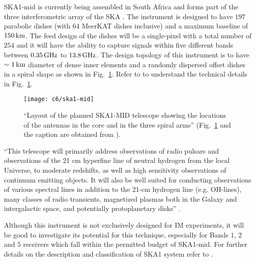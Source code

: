 SKA1-mid is currently being assembled in South Africa and forms part of the three interferometric array of the SKA \citep{2018AAS...23121503S,8105424,vermij2014exascale}. The instrument is designed to have $197$ parabolic dishes (with $64$ MeerKAT dishes inclusive) and a maximum baseline of $150 \, \rm km$. The feed design of the dishes will be a single-pixel with a total number of $254$ \citep{vermij2014exascale} and it will have the ability to capture signals within five different bands between $0.35 \, \rm GHz$ to $13.8 \, \rm GHz$. The design topology of this instrument is to have $\sim 1\, \rm km$ diameter of dense inner elements and a randomly dispersed offset dishes in a spiral shape as shown in Fig.~\ref{fig:ska1-mid}. Refer to \citep{2018arXiv180511455S} to understand the technical details in Fig.~\ref{fig:ska1-mid}.
\begin{figure}
\begin{minipage}[H]{\linewidth}
\centering
\texttt{[image: c6/ska1-mid]}
\caption{\label{fig:ska1-mid} 
\enquote{Layout of the planned SKA1-MID telescope showing the locations of the antennas in the core and in the three spiral arms} (Fig.~\ref{fig:ska1-mid} and the caption are obtained from \citep{2018arXiv180511455S}).}
   \end{minipage}
\end{figure}
\FloatBarrier


\noindent \enquote{This telescope will primarily address observations of radio pulsars and observations of the 21 cm hyperfine line of neutral hydrogen from the local Universe, to moderate redshifts, as well as high
sensitivity observations of continuum emitting objects. It will also be well suited for conducting
observations of various spectral lines in addition to the 21-cm hydrogen line (e.g. OH-lines), many classes
of radio transients, magnetized plasmas both in the Galaxy and intergalactic space, and potentially protoplanetary disks}
\citep{dewdney2015ska1}.


Although this instrument is not exclusively designed for IM experiments, it will be good to investigate its 
potential for this technique, especially for Bands $1$, $2$ and $5$ receivers which fall within the permitted budget of SKA1-mid. For further details on the description and classification of SKA1 system refer to \citep{chai2016experiments,dewdney2015ska1}.



